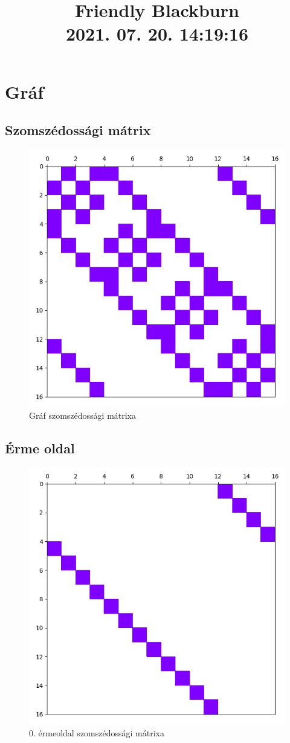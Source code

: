 \documentclass[14pt,a4paper]{article}
\title{Friendly Blackburn \\ \large 2021. 07. 20. 14:19:16}
\author{}
\date{}
\begin{document}
\maketitle
\section{Gráf}
\subsection{Szomszédossági mátrix}
\begin{figure}[H]
\centering
\includegraphics[width = 0.7\columnwidth]{graph/graph.jpg}
\caption{Gráf szomszédossági mátrixa}
\end{figure}
\subsection{Érme oldal}
\begin{figure}[H]
\centering
\includegraphics[width = 0.7\columnwidth]{coin_faces/coin_face_00.jpg}
\caption{0. érmeoldal szomszédossági mátrixa}
\end{figure}
\end{document}
